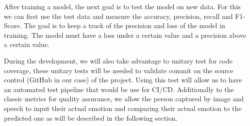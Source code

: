 After training a model, the next goal is to test the model on new data. For this we can first use the test data and measure the accuracy, precision, recall and F1-Score. The goal is to keep a track of the precision and loss of the model in training. The model must have a loss under a certain value and a precision above a certain value. 


During the development, we will also take advantage to unitary test for code coverage, these unitary tests will be needed to validate commit on the source control (GitHub in our case) of the project. Using this test will allow us to have an automated test pipeline that would be use for CI/CD. Additionally to the classic metrics for quality assurance, we allow the person captured by image and speech to input their actual emotion and comparing their actual emotion to the predicted one as will be described in the following section.


%
%    
%
